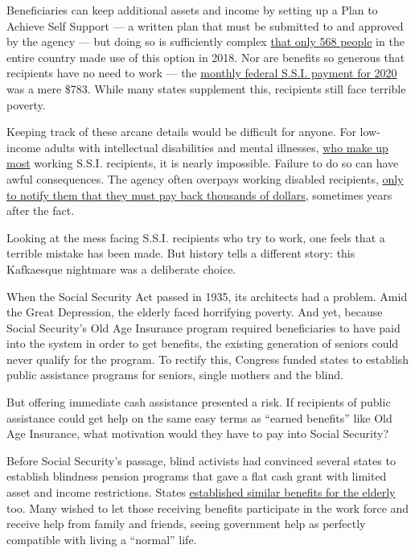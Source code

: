 Beneficiaries can keep additional assets and income by setting up a Plan
to Achieve Self Support --- a written plan that must be submitted to and
approved by the agency --- but doing so is sufficiently complex
\href{https://www.ssa.gov/policy/docs/statcomps/ssi_asr/2018/sect07.html\#_blank}{that
only 568 people} in the entire country made use of this option in 2018.
Nor are benefits so generous that recipients have no need to work ---
the \href{https://www.ssa.gov/oact/cola/SSI.html}{monthly federal S.S.I.
payment for 2020} was a mere \$783. While many states supplement this,
recipients still face terrible poverty.

Keeping track of these arcane details would be difficult for anyone. For
low-income adults with intellectual disabilities and mental illnesses,
\href{https://www.ssa.gov/policy/docs/statcomps/ssi_asr/2018/sect07.html\#_blank}{who
make up most} working S.S.I. recipients, it is nearly impossible.
Failure to do so can have awful consequences. The agency often overpays
working disabled recipients,
\href{https://newrepublic.com/article/158095/civil-legal-system-no-money-no-lawyer-no-justice}{only
to notify them that they must pay back thousands of dollars}, sometimes
years after the fact.

Looking at the mess facing S.S.I. recipients who try to work, one feels
that a terrible mistake has been made. But history tells a different
story: this Kafkaesque nightmare was a deliberate choice.

When the Social Security Act passed in 1935, its architects had a
problem. Amid the Great Depression, the elderly faced horrifying
poverty. And yet, because Social Security's Old Age Insurance program
required beneficiaries to have paid into the system in order to get
benefits, the existing generation of seniors could never qualify for the
program. To rectify this, Congress funded states to establish public
assistance programs for seniors, single mothers and the blind.

But offering immediate cash assistance presented a risk. If recipients
of public assistance could get help on the same easy terms as ``earned
benefits'' like Old Age Insurance, what motivation would they have to
pay into Social Security?

Before Social Security's passage, blind activists had convinced several
states to establish blindness pension programs that gave a flat cash
grant with limited asset and income restrictions. States
\href{https://www.ssa.gov/history/reports/ces/ces2witte2.html}{established
similar benefits for the elderly} too. Many wished to let those
receiving benefits participate in the work force and receive help from
family and friends, seeing government help as perfectly compatible with
living a ``normal'' life.

